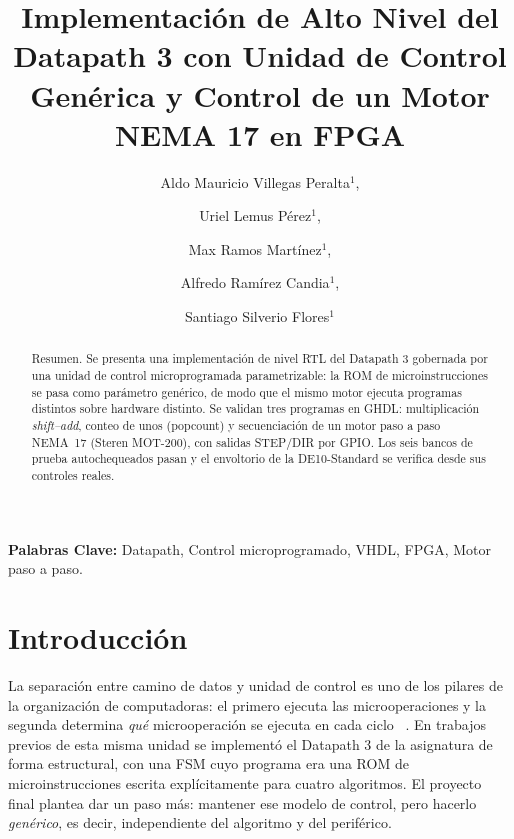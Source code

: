 \documentclass[llncs]{llncs}
\begin{document}
\title{Implementación de Alto Nivel del Datapath 3 con Unidad de Control
Genérica y Control de un Motor NEMA 17 en {FPGA}}

\author{Aldo Mauricio Villegas Peralta$^{1}$,%
\and Uriel Lemus Pérez$^{1}$,%
\and Max Ramos Martínez$^{1}$,%
\and Alfredo Ramírez Candia$^{1}$,%
\and Santiago Silverio Flores$^{1}$}


\maketitle

\begin{abstract}
Resumen. Se presenta una implementación de nivel RTL del Datapath 3 gobernada
por una unidad de control microprogramada parametrizable: la ROM de
microinstrucciones se pasa como parámetro genérico, de modo que el mismo motor
ejecuta programas distintos sobre hardware distinto. Se validan tres
programas en GHDL: multiplicación \emph{shift--add}, conteo de unos (popcount) y
secuenciación de un motor paso a paso NEMA~17 (Steren MOT-200), con salidas
STEP/DIR por GPIO. Los seis bancos de prueba autochequeados pasan y el
envoltorio de la DE10-Standard se verifica desde sus controles reales.
\end{abstract}

\noindent\textbf{Palabras Clave:} Datapath, Control microprogramado, VHDL,
FPGA, Motor paso a paso.

\section{Introducción}
\label{sec:intro}

La separación entre camino de datos y unidad de control es uno de los pilares
de la organización de computadoras: el primero ejecuta las microoperaciones y
la segunda determina \emph{qué} microoperación se ejecuta en cada ciclo
~\cite{stallings2016,patterson2017,patterson2021}. En trabajos previos de esta misma unidad se
implementó el Datapath 3 de la asignatura de forma estructural, con una FSM cuyo
programa era una ROM de microinstrucciones escrita explícitamente para cuatro
algoritmos. El proyecto final plantea dar un paso más: mantener ese modelo de
control, pero hacerlo \emph{genérico}, es decir, independiente del algoritmo y
del periférico.
\end{document}
